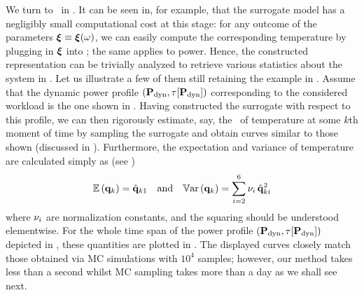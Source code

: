 We turn to \ in .
It can be seen in, for example,  that the surrogate model has a negligibly small computational cost at this stage: for any outcome of the parameters $\boldsymbol{\xi} \equiv \boldsymbol{\xi}(\omega)$, we can easily compute the corresponding temperature by plugging in $\boldsymbol{\xi}$ into ; the same applies to power.
Hence, the constructed representation can be trivially analyzed to retrieve various statistics about the system in .
Let us illustrate a few of them still retaining the example in .
Assume that the dynamic power profile $\profilePdyn$ corresponding to the considered workload is the one shown in .
Having constructed the surrogate with respect to this profile, we can then rigorously estimate, say, the \pdf\ of temperature at some $k$th moment of time by sampling the surrogate and obtain curves similar to those shown  (discussed in ).
Furthermore, the expectation and variance of temperature are calculated simply as (see )
\[
  \mathbb{E}\left(\mathbf{q}_k\right) = \hat{\mathbf{q}}_{k1} \hspace{1em} \text{and} \hspace{1em} \mathbb{V}\text{ar}\left(\mathbf{q}_k\right) = \sum_{i = 2}^{6} \nu_i \, \hat{\mathbf{q}}_{ki}^2
\]
where $\nu_i$ are normalization constants, and the squaring should be understood elementwise.
For the whole time span of the power profile $\profilePdyn$ depicted in , these quantities are plotted in .
The displayed curves closely match those obtained via MC simulations with $10^4$ samples; however, our method takes less than a second whilst MC sampling takes more than a day as we shall see next.


